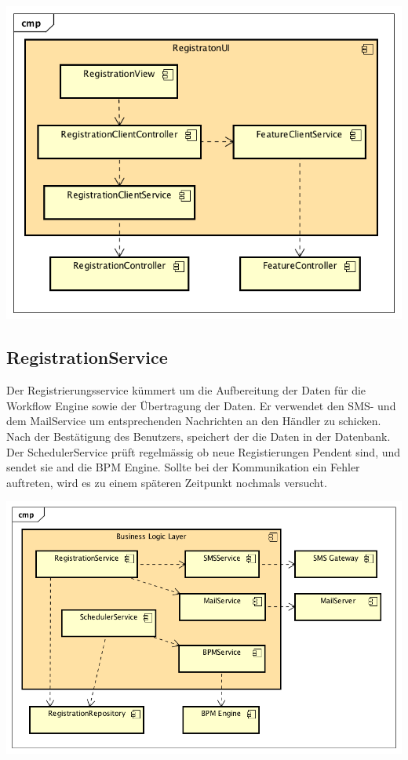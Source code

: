 \begin{center}
	\includegraphics[scale=0.8]{WebComponentLevel2.png}
\end{center}
\newpage
\subsection{RegistrationService}
\label{reg-service}

Der Registrierungsservice kümmert um die Aufbereitung der Daten für die Workflow Engine sowie der Übertragung der Daten. Er verwendet den SMS- und dem MailService um entsprechenden Nachrichten an den Händler zu schicken. Nach der Bestätigung des Benutzers, speichert der die Daten in der Datenbank. Der SchedulerService prüft regelmässig ob neue Registierungen Pendent sind, und sendet sie and die BPM Engine. Sollte bei der Kommunikation ein Fehler auftreten, wird es zu einem späteren Zeitpunkt nochmals versucht.
\begin{center}
	\includegraphics[scale=0.65]{RegistrationServicesLevel2.png}
\end{center}

